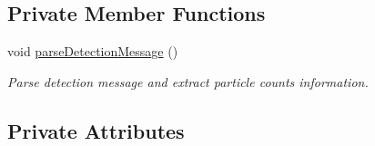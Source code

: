 \subsection*{Private Member Functions}
\begin{DoxyCompactItemize}
\item 
void \hyperlink{class_particle_detection_belief_ad1eef5913edcc63652738bc3c8497f78}{parseDetectionMessage} ()
\begin{DoxyCompactList}\small\item\em Parse detection message and extract particle counts information. \end{DoxyCompactList}\end{DoxyCompactItemize}
\subsection*{Private Attributes}
